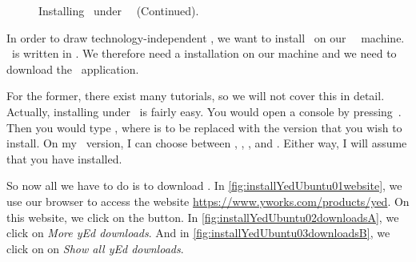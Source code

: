 %
\begin{figure}%
\ContinuedFloat%
\centering%
%
%
%
\floatSep%
%
%
%
\floatRowSep%
%
%
%
\floatSep%
%
%
%
\floatRowSep%
%
%
%
\caption{Installing \yEd\ under \ubuntu\ \linux~(Continued).}%
\label{fig:installYedUbuntu:C}%
\end{figure}%
%
In order to draw technology-independent , we want to install \yEd\ on our \ubuntu\ \linux\ machine.
\yEd\ is written in .
We therefore need a  installation on our machine and we need to download the \yEd\ application.

For the former, there exist many tutorials, so we will not cover this in detail.
Actually, installing  under \ubuntu\ is fairly easy.
You would open a console  by pressing~\ubuntuTerminal.
Then you would type , where  is to be replaced with the version that you wish to install.
On my \ubuntu\ version, I can choose between , , , and .
Either way, I will assume that you have  installed.

So now all we have to do is to download \yEd.
In \cref{fig:installYedUbuntu01website}, we use our browser to access the website \url{https://www.yworks.com/products/yed}.
On this website, we click on the  button.
In \cref{fig:installYedUbuntu02downloadsA}, we click on \emph{More yEd downloads}.
And in \cref{fig:installYedUbuntu03downloadsB}, we click on on \emph{Show all yEd downloads}.

